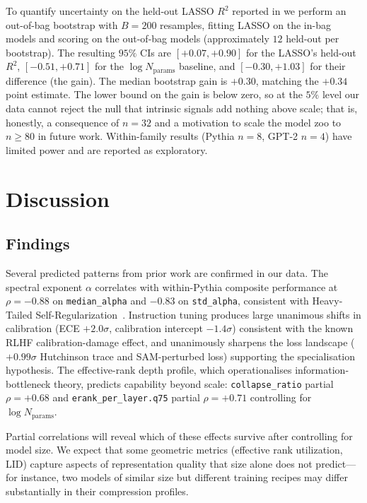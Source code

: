 \documentclass[preprint]{neurips_2025}
\begin{document}
To quantify uncertainty on the held-out LASSO $R^2$ reported in  we perform an out-of-bag bootstrap with $B = 200$ resamples, fitting LASSO on the in-bag models and scoring on the out-of-bag models (approximately $12$ held-out per bootstrap). The resulting $95\%$ CIs are $[+0.07, +0.90]$ for the LASSO's held-out $R^2$, $[-0.51, +0.71]$ for the $\log N_{\text{params}}$ baseline, and $[-0.30, +1.03]$ for their difference (the gain). The median bootstrap gain is $+0.30$, matching the $+0.34$ point estimate. The lower bound on the gain is below zero, so at the $5\%$ level our data cannot reject the null that intrinsic signals add nothing above scale; that is, honestly, a consequence of $n = 32$ and a motivation to scale the model zoo to $n \geq 80$ in future work.
Within-family results (Pythia $n=8$, GPT-2 $n=4$) have limited power and are reported as exploratory.

\section{Discussion}
\label{sec:discussion}

\subsection{Findings}

Several predicted patterns from prior work are confirmed in our data.
The spectral exponent $\alpha$ correlates with within-Pythia composite performance at $\rho = -0.88$ on \texttt{median\_alpha} and $-0.83$ on \texttt{std\_alpha}, consistent with Heavy-Tailed Self-Regularization~\citep{martin2021implicit}.
Instruction tuning produces large unanimous shifts in calibration (ECE $+2.0\sigma$, calibration intercept $-1.4\sigma$) consistent with the known RLHF calibration-damage effect, and unanimously sharpens the loss landscape ($+0.99\sigma$ Hutchinson trace and SAM-perturbed loss) supporting the specialisation hypothesis. The effective-rank depth profile, which operationalises information-bottleneck theory, predicts capability beyond scale: \texttt{collapse\_ratio} partial $\rho = +0.68$ and \texttt{erank\_per\_layer.q75} partial $\rho = +0.71$ controlling for $\log N_{\text{params}}$.

Partial correlations will reveal which of these effects survive after controlling for model size.
We expect that some geometric metrics (effective rank utilization, LID) capture aspects of representation quality that size alone does not predict---for instance, two models of similar size but different training recipes may differ substantially in their compression profiles.
\end{document}
